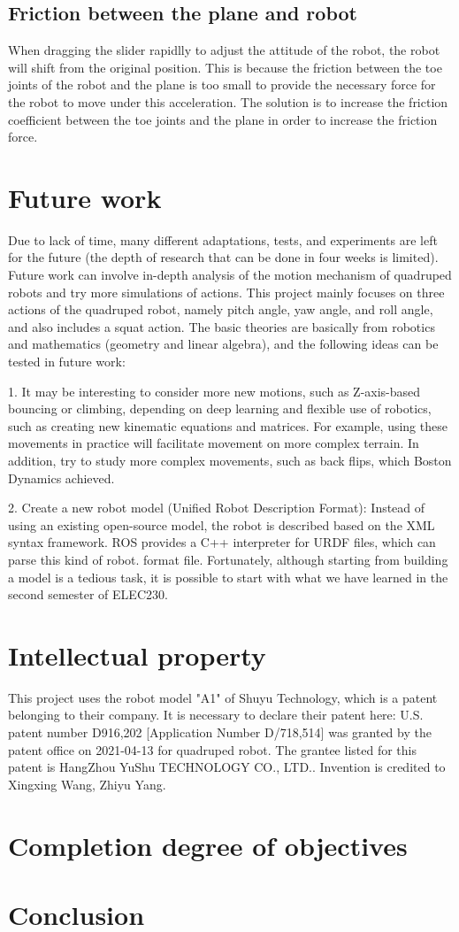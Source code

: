 \subsection{Friction between the plane and robot}
When dragging the slider rapidlly to adjust the attitude of the robot, the robot will shift from the original position. This is because the friction between the toe joints of the robot and the plane is too small to provide the necessary force for the robot to move under this acceleration. The solution is to increase the friction coefficient between the toe joints and the plane in order to increase the friction force.


\section{Future work}
Due to lack of time, many different adaptations, tests, and experiments are left for the future (the depth of research that can be done in four weeks is limited). Future work can involve in-depth analysis of the motion mechanism of quadruped robots and try more simulations of actions.
This project mainly focuses on three actions of the quadruped robot, namely pitch angle, yaw angle, and roll angle, and also includes a squat action. The basic theories are basically from robotics and mathematics (geometry and linear algebra), and the following ideas can be tested in future work:

1. It may be interesting to consider more new motions, such as Z-axis-based bouncing or climbing, depending on deep learning and flexible use of robotics, such as creating new kinematic equations and matrices. For example, using these movements in practice will facilitate movement on more complex terrain. In addition, try to study more complex movements, such as back flips, which Boston Dynamics achieved.

2. Create a new robot model (Unified Robot Description Format): Instead of using an existing open-source model, the robot is described based on the XML syntax framework. ROS provides a C++ interpreter for URDF files, which can parse this kind of robot. format file. Fortunately, although starting from building a model is a tedious task, it is possible to start with what we have learned in the second semester of ELEC230. 

\section{Intellectual property}
This project uses the robot model "A1" of Shuyu Technology, which is a patent belonging to their company. It is necessary to declare their patent here: U.S. patent number D916,202 [Application Number D/718,514] was granted by the patent office on 2021-04-13 for quadruped robot. The grantee listed for this patent is HangZhou YuShu TECHNOLOGY CO., LTD.. Invention is credited to Xingxing Wang, Zhiyu Yang. 

\section{Completion degree of objectives}







\section{Conclusion}